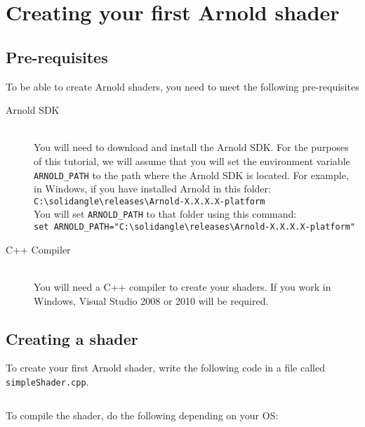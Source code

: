 \section{Creating your first Arnold shader}

\subsection{Pre-requisites}

To be able to create Arnold shaders, you need to meet the following pre-requisites

\begin{description}

\item[Arnold SDK] \hfill \\
You will need to download and install the Arnold SDK. For the purposes of this tutorial, we will assume that you will set the environment variable \texttt{ARNOLD\_PATH} to the path where the Arnold SDK is located. For example, in Windows, if you have installed Arnold in this folder:\\
\verb|C:\solidangle\releases\Arnold-X.X.X.X-platform|\\
You will set \texttt{ARNOLD\_PATH} to that folder using this command:\\
{\footnotesize \verb|set ARNOLD_PATH="C:\solidangle\releases\Arnold-X.X.X.X-platform"| }

\item[C++ Compiler] \hfill \\
You will need a C++ compiler to create your shaders. If you work in Windows, Visual Studio 2008 or 2010 will be required.
\end{description}

\subsection{Creating a shader}

To create your first Arnold shader, write the following code in a file called \texttt{simpleShader.cpp}.

\inputminted[mathescape,
linenos,
numbersep=5pt,
frame=lines,
framesep=2mm,
baselinestretch=1,
fontsize=\footnotesize,
tabsize=3,
label=simpleShader.cpp]
{c++}{simpleShader.cpp}

To compile the shader, do the following depending on your OS:

